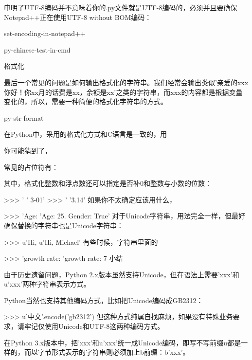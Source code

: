 \documentclass[10pt,a4paper]{ctexbook}
\begin{document}
申明了UTF-8编码并不意味着你的.py文件就是UTF-8编码的，必须并且要确保Notepad++正在使用UTF-8 without BOM编码：

set-encoding-in-notepad++


py-chinese-test-in-cmd

格式化

最后一个常见的问题是如何输出格式化的字符串。我们经常会输出类似'亲爱的xxx你好！你xx月的话费是xx，余额是xx'之类的字符串，而xxx的内容都是根据变量变化的，所以，需要一种简便的格式化字符串的方式。

py-str-format

在Python中，采用的格式化方式和C语言是一致的，用%

你可能猜到了，%

常见的占位符有：

其中，格式化整数和浮点数还可以指定是否补0和整数与小数的位数：

>>> '%
' 3-01'
>>> '%
'3.14'
如果你不太确定应该用什么，%

>>> 'Age: %
'Age: 25. Gender: True'
对于Unicode字符串，用法完全一样，但最好确保替换的字符串也是Unicode字符串：

>>> u'Hi, %
u'Hi, Michael'
有些时候，字符串里面的%

>>> 'growth rate: %
'growth rate: 7 %
小结

由于历史遗留问题，Python 2.x版本虽然支持Unicode，但在语法上需要'xxx'和u'xxx'两种字符串表示方式。

Python当然也支持其他编码方式，比如把Unicode编码成GB2312：

>>> u'中文'.encode('gb2312')
但这种方式纯属自找麻烦，如果没有特殊业务要求，请牢记仅使用Unicode和UTF-8这两种编码方式。

在Python 3.x版本中，把'xxx'和u'xxx'统一成Unicode编码，即写不写前缀u都是一样的，而以字节形式表示的字符串则必须加上b前缀：b'xxx'。
\end{document}
